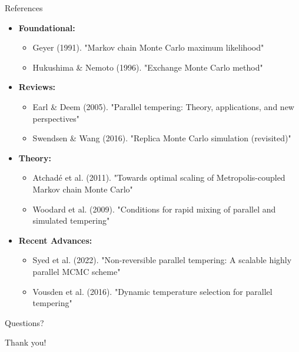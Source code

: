 \documentclass[aspectratio=169]{beamer}
\begin{document}
\begin{frame}{References}
\begin{itemize}
    \item \textbf{Foundational:}
    \begin{itemize}
        \item Geyer (1991). "Markov chain Monte Carlo maximum likelihood"
        \item Hukushima \& Nemoto (1996). "Exchange Monte Carlo method"
    \end{itemize}
    
    \item \textbf{Reviews:}
    \begin{itemize}
        \item Earl \& Deem (2005). "Parallel tempering: Theory, applications, and new perspectives"
        \item Swendsen \& Wang (2016). "Replica Monte Carlo simulation (revisited)"
    \end{itemize}
    
    \item \textbf{Theory:}
    \begin{itemize}
        \item Atchadé et al. (2011). "Towards optimal scaling of Metropolis-coupled Markov chain Monte Carlo"
        \item Woodard et al. (2009). "Conditions for rapid mixing of parallel and simulated tempering"
    \end{itemize}
    
    \item \textbf{Recent Advances:}
    \begin{itemize}
        \item Syed et al. (2022). "Non-reversible parallel tempering: A scalable highly parallel MCMC scheme"
        \item Vousden et al. (2016). "Dynamic temperature selection for parallel tempering"
    \end{itemize}
\end{itemize}
\end{frame}

\begin{frame}
\begin{center}
\Huge{\textcolor{copenhagenred}{Questions?}}

\vspace{1cm}
\Large{Thank you!}
\end{center}
\end{frame}
\end{document}
